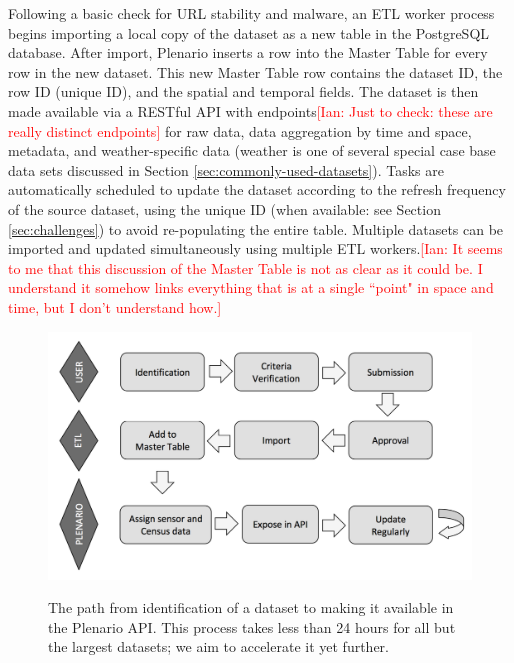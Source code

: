 \documentclass[11pt]{article}
\newcommand{\ian}[1]{\textcolor{Red}{[Ian: #1]}}
\newcommand{\ian}[1]{}
\begin{document}
Following a basic check for URL stability and malware, an ETL worker process begins importing a local copy of the dataset as a new table in the PostgreSQL database. After import, Plenario inserts a row into the Master Table for every row in the new dataset. This new Master Table row contains the dataset ID, the row ID (unique ID), and the spatial and temporal fields. The dataset is then made available via a RESTful API with endpoints\ian{Just to check: these are really distinct endpoints} for raw data, data aggregation by time and space, metadata, and weather-specific data (weather is one of several special case base data sets discussed in Section \ref{sec:commonly-used-datasets}). Tasks are automatically scheduled to update the dataset according to the refresh frequency of the source dataset, using the unique ID (when available: see Section \ref{sec:challenges}) to avoid re-populating the entire table. Multiple datasets can be imported and updated simultaneously using multiple ETL workers.\ian{It seems to me that this discussion of the Master Table is not as clear as it could be. I understand it somehow links everything that is at a single ``point" in space and time, but I don't understand how.}

\begin{figure}
	\centering
	\includegraphics[scale=.45]{flowchart.pdf}
	\label{fig:flowchart}
	\caption{The path from identification of a dataset to making it available in the Plenario API. This process takes less than 24 hours for all but the largest datasets; we aim to accelerate it yet further.}
\end{figure}
\end{document}
